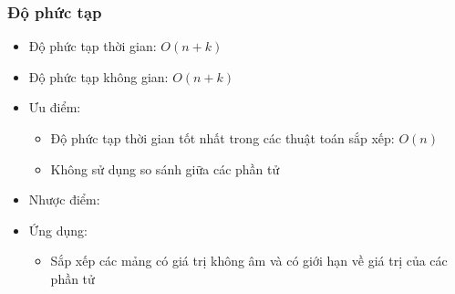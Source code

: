 \subsubsection{Độ phức tạp}

\begin{itemize}
    \item Độ phức tạp thời gian: $O(n + k)$
    \item Độ phức tạp không gian: $O(n + k)$
    \item Ưu điểm:
        \begin{itemize}
            \item Độ phức tạp thời gian tốt nhất trong các thuật toán sắp xếp: $O(n)$
            \item Không sử dụng so sánh giữa các phần tử
        \end{itemize}
    \item Nhược điểm:
    \item Ứng dụng:
        \begin{itemize}
            \item Sắp xếp các mảng có giá trị không âm và có giới hạn về giá trị của các phần tử
        \end{itemize}
\end{itemize}
